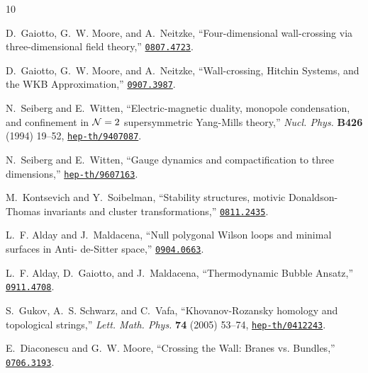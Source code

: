 \begin{thebibliography}{10}

D.~Gaiotto, G.~W. Moore, and A.~Neitzke, ``{Four-dimensional wall-crossing via
  three-dimensional field theory},''
\href{http://www.arXiv.org/abs/0807.4723}{{\tt 0807.4723}}.

D.~Gaiotto, G.~W. Moore, and A.~Neitzke, ``{Wall-crossing, Hitchin Systems, and
  the WKB Approximation},''
\href{http://www.arXiv.org/abs/0907.3987}{{\tt 0907.3987}}.

N.~Seiberg and E.~Witten, ``Electric-magnetic duality, monopole condensation,
  and confinement in {$\mathcal{N}=2$} supersymmetric {Y}ang-{M}ills theory,'' {\em
  Nucl. Phys.} {\bf B426} (1994) 19--52,
\href{http://www.arXiv.org/abs/hep-th/9407087}{{\tt hep-th/9407087}}.

N.~Seiberg and E.~Witten, ``Gauge dynamics and compactification to three
  dimensions,''
\href{http://www.arXiv.org/abs/hep-th/9607163}{{\tt hep-th/9607163}}.

M.~Kontsevich and Y.~Soibelman, ``{S}tability structures, motivic
  {D}onaldson-{T}homas invariants and cluster transformations,''
  \href{http://www.arXiv.org/abs/0811.2435}{{\tt 0811.2435}}.

L.~F. Alday and J.~Maldacena, ``{Null polygonal Wilson loops and minimal
  surfaces in Anti- de-Sitter space},''
\href{http://www.arXiv.org/abs/0904.0663}{{\tt 0904.0663}}.

L.~F. Alday, D.~Gaiotto, and J.~Maldacena, ``{Thermodynamic Bubble Ansatz},''
\href{http://www.arXiv.org/abs/0911.4708}{{\tt 0911.4708}}.

S.~Gukov, A.~S. Schwarz, and C.~Vafa, ``{Khovanov-Rozansky homology and
  topological strings},'' {\em Lett. Math. Phys.} {\bf 74} (2005) 53--74,
\href{http://www.arXiv.org/abs/hep-th/0412243}{{\tt hep-th/0412243}}.

E.~Diaconescu and G.~W. Moore, ``{Crossing the Wall: Branes vs. Bundles},''
\href{http://www.arXiv.org/abs/0706.3193}{{\tt 0706.3193}}.


\end{thebibliography}
